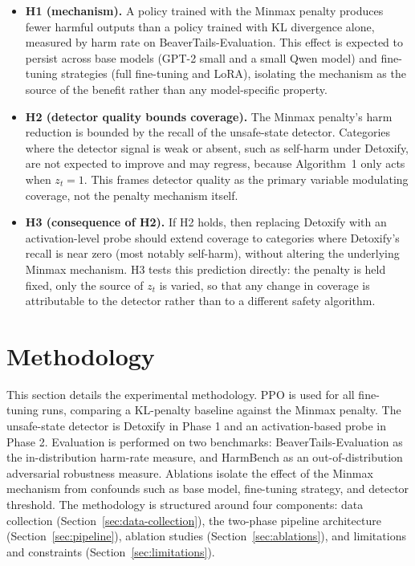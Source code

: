\documentclass[a4paper,twoside,12pt]{report}
\begin{document}
\begin{itemize}
  \item \textbf{H1 (mechanism).} A policy trained with the Minmax penalty produces fewer
    harmful outputs than a policy trained with KL divergence alone, measured by harm rate
    on BeaverTails-Evaluation. This effect is expected to persist across base models
    (GPT-2 small and a small Qwen model) and fine-tuning strategies (full fine-tuning and
    LoRA), isolating the mechanism as the source of the benefit rather than any
    model-specific property.
  \item \textbf{H2 (detector quality bounds coverage).} The Minmax penalty's harm
    reduction is bounded by the recall of the unsafe-state detector. Categories where the
    detector signal is weak or absent, such as self-harm under Detoxify, are not expected
    to improve and may regress, because Algorithm~1 only acts when $z_t = 1$. This frames
    detector quality as the primary variable modulating coverage, not the penalty
    mechanism itself.
  \item \textbf{H3 (consequence of H2).} If H2 holds, then replacing Detoxify with an
    activation-level probe should extend coverage to categories where Detoxify's recall is
    near zero (most notably self-harm), without altering the underlying Minmax mechanism.
    H3 tests this prediction directly: the penalty is held fixed, only the source of $z_t$
    is varied, so that any change in coverage is attributable to the detector rather than
    to a different safety algorithm.
\end{itemize}

\section{Methodology}
\label{sec:methodology}

This section details the experimental methodology. PPO is used for all fine-tuning runs,
comparing a KL-penalty baseline against the Minmax penalty. The unsafe-state detector is
Detoxify in Phase 1 and an activation-based probe in Phase 2. Evaluation is performed on
two benchmarks: BeaverTails-Evaluation \citep{ji2023beavertails} as the in-distribution
harm-rate measure, and HarmBench \citep{mazeika2024} as an out-of-distribution adversarial
robustness measure. Ablations isolate the effect of the Minmax mechanism from confounds
such as base model, fine-tuning strategy, and detector threshold. The methodology is
structured around four components: data collection (Section~\ref{sec:data-collection}),
the two-phase pipeline architecture (Section~\ref{sec:pipeline}), ablation studies
(Section~\ref{sec:ablations}), and limitations and constraints
(Section~\ref{sec:limitations}).
\end{document}
